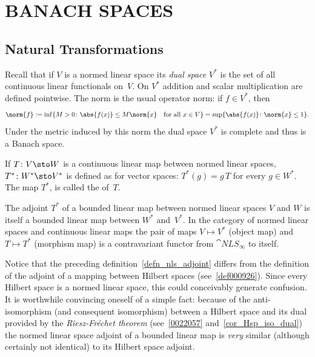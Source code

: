 \chapter{BANACH SPACES}

\section{Natural Transformations}
 Recall that if $V$ is a normed linear space its
\emph{dual space} $V^*$ is the set of all continuous linear functionals on~$V$.  On $V^*$ addition and
scalar multiplication are defined pointwise. The norm is the usual operator norm: if $f \in V^*$, then
 \[ \norm{f} := \inf\{M > 0\colon \abs{f(x)} \le M\norm{x}\quad \text{for all $x \in V$}\} = \sup\{\abs{f(x)}\colon \norm{x} \le 1\}. \]
Under the metric induced by this norm the dual space $V^*$ is complete and thus is a Banach space.

\begin{defn}\label{defn_nls_adjoint} If $T\colon V \sto W$ is a continuous linear map between normed linear spaces,
$T^*\colon W^* \sto V^*$ is defined as for vector spaces: $T^*(g) = g\,T$ for every
$g \in W^*$.  The map $T^*$, is called the
 of~$T$.
\end{defn}

\begin{exam}\label{exam_dual_functor} The adjoint $T^*$ of a bounded linear map between normed linear spaces $V$ and 
$W$ is itself a bounded linear map between $W^*$ and~$V^*$. In the category of normed linear spaces and continuous linear
maps the pair of maps $V \mapsto V^*$ (object map) and $T \mapsto T^*$ (morphism map) is a contravariant
functor from $\cat{NLS_\infty}$ to itself.
\end{exam}

Notice that the preceding definition~\ref{defn_nls_adjoint} differs from the definition of the adjoint of a mapping
between Hilbert spaces (see~\ref{def000926}).  Since every Hilbert space is a normed linear space, this could conceivably
generate confusion.  It is worthwhile convincing oneself of a simple fact: because of the anti-isomorphism (and consequent
isomorphism) between a Hilbert space and its dual provided by the \emph{Riesz-Fr\'echet theorem} (see~\ref{0022057}
and~\ref{cor_Hsp_iso_dual}) the normed linear space adjoint of a bounded linear map is \emph{very} similar (although
certainly not identical) to its Hilbert space adjoint.

